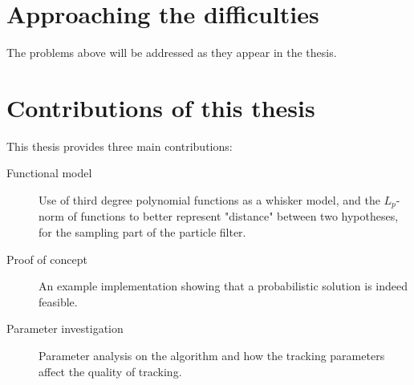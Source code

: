 \section{Approaching the difficulties}
The problems above will be addressed as they appear in the thesis.

\section{Contributions of this thesis}
This thesis provides three main contributions:
\begin{description}
\item[Functional model] Use of third degree polynomial functions as a
  whisker model, and the $L_p$-norm of functions to better represent
  "distance" between two hypotheses, for the sampling part of the
  particle filter.
\item[Proof of concept] An example implementation showing that a
  probabilistic solution is indeed feasible.
\item[Parameter investigation] Parameter analysis on the algorithm and
  how the tracking parameters affect the quality of tracking.

\end{description}
